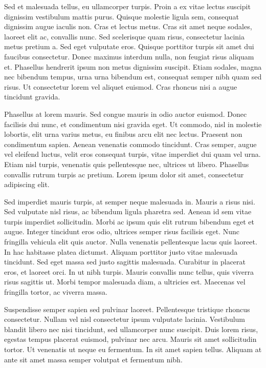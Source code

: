Sed et malesuada tellus, eu ullamcorper turpis. Proin a ex vitae lectus suscipit dignissim vestibulum mattis purus. Quisque molestie ligula sem, consequat dignissim augue iaculis non. Cras et lectus metus. Cras sit amet neque sodales, laoreet elit ac, convallis nunc. Sed scelerisque quam risus, consectetur lacinia metus pretium a. Sed eget vulputate eros. Quisque porttitor turpis sit amet dui faucibus consectetur. Donec maximus interdum nulla, non feugiat risus aliquam et. Phasellus hendrerit ipsum non metus dignissim suscipit. Etiam sodales, magna nec bibendum tempus, urna urna bibendum est, consequat semper nibh quam sed risus. Ut consectetur lorem vel aliquet euismod. Cras rhoncus nisi a augue tincidunt gravida.

Phasellus at lorem mauris. Sed congue mauris in odio auctor euismod. Donec facilisis dui nunc, et condimentum nisi gravida eget. Ut commodo, nisl in molestie lobortis, elit urna varius metus, eu finibus arcu elit nec lectus. Praesent non condimentum sapien. Aenean venenatis commodo tincidunt. Cras semper, augue vel eleifend luctus, velit eros consequat turpis, vitae imperdiet dui quam vel urna. Etiam nisl turpis, venenatis quis pellentesque nec, ultrices ut libero. Phasellus convallis rutrum turpis ac pretium. Lorem ipsum dolor sit amet, consectetur adipiscing elit.

Sed imperdiet mauris turpis, at semper neque malesuada in. Mauris a risus nisi. Sed vulputate nisl risus, ac bibendum ligula pharetra sed. Aenean id sem vitae turpis imperdiet sollicitudin. Morbi ac ipsum quis elit rutrum bibendum eget et augue. Integer tincidunt eros odio, ultrices semper risus facilisis eget. Nunc fringilla vehicula elit quis auctor. Nulla venenatis pellentesque lacus quis laoreet. In hac habitasse platea dictumst. Aliquam porttitor justo vitae malesuada tincidunt. Sed eget massa sed justo sagittis malesuada. Curabitur in placerat eros, et laoreet orci. In ut nibh turpis. Mauris convallis nunc tellus, quis viverra risus sagittis ut. Morbi tempor malesuada diam, a ultricies est. Maecenas vel fringilla tortor, ac viverra massa.

Suspendisse semper sapien sed pulvinar laoreet. Pellentesque tristique rhoncus consectetur. Nullam vel nisl consectetur ipsum vulputate lacinia. Vestibulum blandit libero nec nisi tincidunt, sed ullamcorper nunc suscipit. Duis lorem risus, egestas tempus placerat euismod, pulvinar nec arcu. Mauris sit amet sollicitudin tortor. Ut venenatis ut neque eu fermentum. In sit amet sapien tellus. Aliquam at ante sit amet massa semper volutpat et fermentum nibh.
